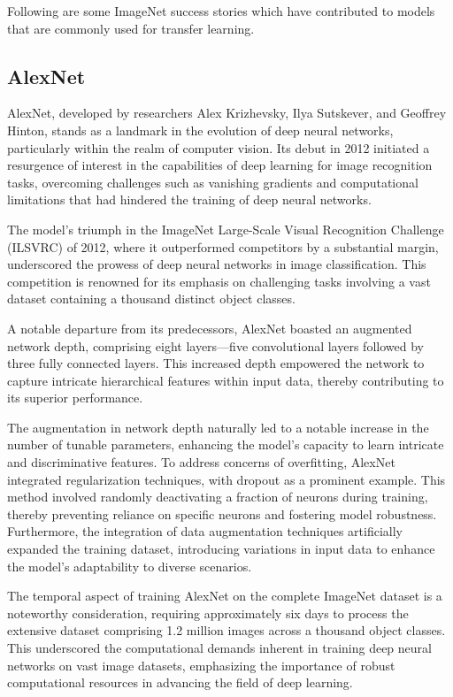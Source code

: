 \documentclass{report}
\begin{document}
Following are some ImageNet success stories which have contributed to models that are commonly used for transfer learning.

\subsection{AlexNet}
AlexNet, developed by researchers Alex Krizhevsky, Ilya Sutskever, and Geoffrey Hinton, stands as a landmark in the evolution of deep neural networks, particularly within the realm of computer vision. Its debut in 2012 initiated a resurgence of interest in the capabilities of deep learning for image recognition tasks, overcoming challenges such as vanishing gradients and computational limitations that had hindered the training of deep neural networks.

The model's triumph in the ImageNet Large-Scale Visual Recognition Challenge (ILSVRC) of 2012, where it outperformed competitors by a substantial margin, underscored the prowess of deep neural networks in image classification. This competition is renowned for its emphasis on challenging tasks involving a vast dataset containing a thousand distinct object classes.

A notable departure from its predecessors, AlexNet boasted an augmented network depth, comprising eight layers—five convolutional layers followed by three fully connected layers. This increased depth empowered the network to capture intricate hierarchical features within input data, thereby contributing to its superior performance.

The augmentation in network depth naturally led to a notable increase in the number of tunable parameters, enhancing the model's capacity to learn intricate and discriminative features. To address concerns of overfitting, AlexNet integrated regularization techniques, with dropout as a prominent example. This method involved randomly deactivating a fraction of neurons during training, thereby preventing reliance on specific neurons and fostering model robustness. Furthermore, the integration of data augmentation techniques artificially expanded the training dataset, introducing variations in input data to enhance the model's adaptability to diverse scenarios.

The temporal aspect of training AlexNet on the complete ImageNet dataset is a noteworthy consideration, requiring approximately six days to process the extensive dataset comprising 1.2 million images across a thousand object classes. This underscored the computational demands inherent in training deep neural networks on vast image datasets, emphasizing the importance of robust computational resources in advancing the field of deep learning.
\end{document}
